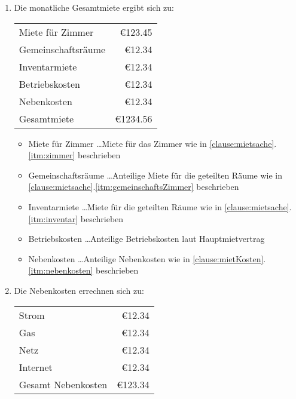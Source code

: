 \documentclass{scrreprt}[12pt,a4paper,twoside,duplex]
\newcommand{\mieteGesamt}{\euro{1234.56}}
\newcommand{\mieteZimmer}{\euro{123.45}}
\newcommand{\mieteGemeinschaftsraeume}{\euro{12.34}}
\newcommand{\inventarmiete}{\euro{12.34}}
\newcommand{\betriebskosten}{\euro{12.34}}
\newcommand{\mietNebenkosten}{\euro{12.34}}
\newcommand{\strom}{\euro{12.34}}
\newcommand{\gas}{\euro{12.34}}
\newcommand{\netz}{\euro{12.34}}
\newcommand{\internet}{\euro{12.34}}
\newcommand{\mietNebenkostenGesamt}{\euro{123.34}}
\begin{document}
\begin{contract}
\label{clause:mietKosten}
\begin{enumerate}
	\item Die monatliche Gesamtmiete ergibt sich zu:\quad
	\begin{tabular}[t]{lr}
		Miete für Zimmer & \mieteZimmer \\
		Gemeinschaftsräume & \mieteGemeinschaftsraeume \\
		Inventarmiete & \inventarmiete \\
		Betriebskosten & \betriebskosten \\
		Nebenkosten & \mietNebenkosten \\ \midrule
		Gesamtmiete & \mieteGesamt \\ \bottomrule[2pt]
	\end{tabular}
	\vspace{0.2cm}
	\begin{itemize}
		\item Miete für Zimmer \dots Miete für das Zimmer wie in \ref{clause:mietsache}.\ref{itm:zimmer} beschrieben

		\item Gemeinschaftsräume \dots Anteilige Miete für die geteilten Räume wie in \ref{clause:mietsache}.\ref{itm:gemeinschaftsZimmer} beschrieben

		\item Inventarmiete \dots Miete für die geteilten Räume wie in \ref{clause:mietsache}.\ref{itm:inventar} beschrieben

		\item Betriebskosten \dots Anteilige Betriebskosten laut Hauptmietvertrag
		
		\item Nebenkosten \dots Anteilige Nebenkosten wie in \ref{clause:mietKosten}.\ref{itm:nebenkosten} beschrieben
		
	\end{itemize}
	\vspace{0.2cm}
	\item Die Nebenkosten errechnen sich zu:\quad
	\label{itm:nebenkosten}
 	\begin{tabular}[t]{lr}
	  	Strom & \strom \\
	  	Gas & \gas \\
	  	Netz & \netz \\
	  	Internet & \internet \\ \midrule
	  	Gesamt Nebenkosten & \mietNebenkostenGesamt \\ \bottomrule[2pt]
 	\end{tabular}
	\vspace{0.2cm}


\end{enumerate}
\end{contract}
\end{document}
